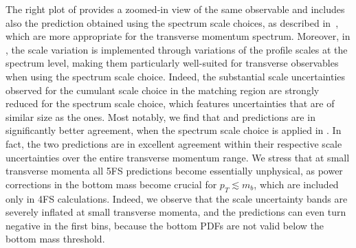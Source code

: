 \documentclass[11pt,a4paper]{article}
\begin{document}
The right plot of  provides a zoomed-in view of the same observable and includes also the \GENEVA{} prediction obtained using the spectrum scale choices, as described in~, which are more appropriate for the transverse momentum spectrum. 
Moreover, in \GENEVA{}, the scale variation is implemented through variations of the profile scales at the spectrum level, making them particularly well-suited for transverse observables when using the spectrum scale choice. Indeed, the substantial 
scale uncertainties observed for the cumulant scale choice
in the matching region are strongly reduced for the spectrum scale choice, which 
features uncertainties that are of similar size as the \minnlo{} ones.
Most notably, we find that \minnlo{} and \GENEVA{} predictions are in significantly 
better agreement, when the spectrum scale choice is applied in \GENEVA{}.
In fact, the two predictions are in excellent agreement within their respective scale
uncertainties over the entire transverse momentum range.
We stress that at small transverse momenta all 5FS predictions
become essentially unphysical, as power corrections in the 
bottom mass become crucial for $p_T\lesssim m_b$, which are included only 
in 4FS calculations. Indeed, we observe that the scale uncertainty bands are
severely inflated at small transverse momenta, and the predictions can
even turn negative in the first bins, because the bottom PDFs are not valid below
the bottom mass threshold.
\end{document}
